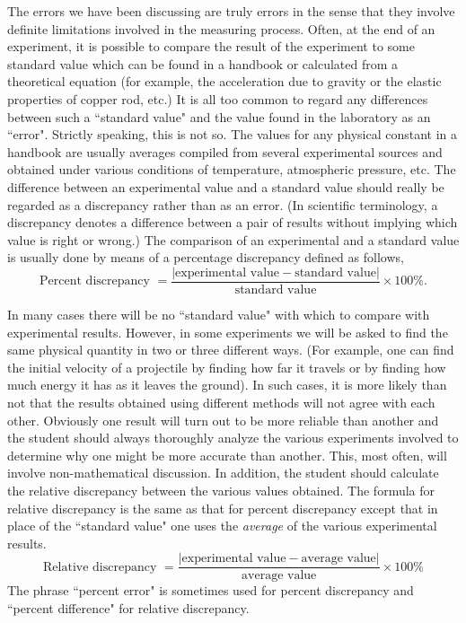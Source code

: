 \documentclass[main.tex]{subfiles}
\begin{document}
The errors we have been discussing are truly errors in the sense that they involve definite limitations involved in the measuring process.  Often, at the end of an experiment, it is possible to compare the result of the experiment to some standard value which can be found in a handbook or calculated from a theoretical equation (for example, the acceleration due to gravity or the elastic properties of copper rod, etc.)  It is all too common to regard any differences between such a ``standard value" and the value found in the laboratory as an ``error".  Strictly speaking, this is not so.  The values for any physical constant in a handbook are usually averages compiled from several experimental sources and obtained under various conditions of temperature, atmospheric pressure, etc.  The difference between an experimental value and a standard value should really be regarded as a discrepancy rather than as an error.  (In scientific terminology, a discrepancy denotes a difference between a pair of results without implying which value is right or wrong.)  The comparison of an experimental and a standard value is usually done by means of a percentage discrepancy defined as follows,
\[
\text{Percent discrepancy } = \frac{|\text{experimental value} - \text{standard value}|}{\text{standard value}}\times 100\%.
\]

In many cases there will be no ``standard value" with which to compare with experimental results.  However, in some experiments we will be asked to find the same physical quantity in two or three different ways.  (For example, one can find the initial velocity of a projectile by finding how far it travels or by finding how much energy it has as it leaves the ground).  In such cases, it is more likely than not that the results obtained using different methods will not agree with each other.  Obviously one result will turn out to be more reliable than another and the student should always thoroughly analyze the various experiments involved to determine why one might be more accurate than another. This, most often, will involve non-mathematical discussion.  In addition, the student should calculate the relative discrepancy between the various values obtained.  The formula for relative discrepancy is the same as that for percent discrepancy except that in place of the ``standard value" one uses the \emph{average} of the various experimental results.
\[ \label{page:Relative_Discrepancy}
\text{Relative discrepancy } = \frac{|\text{experimental value} - \text{average value}|}{\text{average value}} \times 100\%
\]
The phrase ``percent error" is sometimes used for percent discrepancy and ``percent difference" for relative discrepancy.
	
\end{document}
